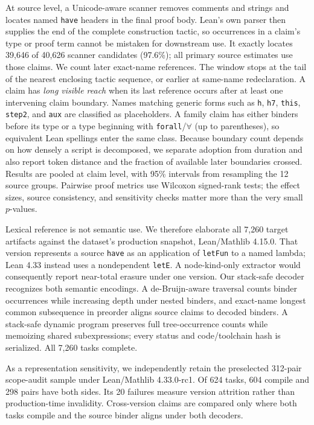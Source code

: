 \documentclass[10pt]{article}
\newcommand{\code}[1]{\texttt{#1}}
\begin{document}
At source level, a Unicode-aware scanner removes comments and strings and locates named
\code{have} headers in the final proof body.  Lean's own parser then supplies the end of the
complete construction tactic, so occurrences in a claim's type or proof term cannot be mistaken
for downstream use.  It exactly locates 39,646 of 40,626 scanner candidates (97.6\%); all primary
source estimates use those claims.  We count later exact-name references.  The window stops
at the tail of the nearest enclosing tactic sequence, or earlier at same-name redeclaration.  A claim has \emph{long visible
reach} when its last reference occurs after at least one intervening claim boundary.  Names matching
generic forms such as \code{h}, \code{h7}, \code{this}, \code{step2}, and \code{aux} are classified
as placeholders.  A family claim has either binders before its type or a type beginning with
\code{forall}/$\forall$ (up to parentheses), so equivalent Lean spellings enter the same class.
Because boundary count depends on how densely a script is decomposed, we separate adoption from
duration and also report token distance and the fraction of available later boundaries crossed.
Results are pooled at claim level, with 95\% intervals from resampling the 12
source groups.  Pairwise proof metrics use Wilcoxon signed-rank tests; the effect sizes, source
consistency, and sensitivity checks matter more than the very small $p$-values.

Lexical reference is not semantic use.  We therefore elaborate all 7,260 target artifacts against
the dataset's production snapshot, Lean/Mathlib 4.15.0.  That version represents a source
\code{have} as an application of \code{letFun} to a named lambda; Lean 4.33 instead uses a
nondependent \code{letE}.  A node-kind-only extractor would consequently report near-total erasure
under one version.  Our stack-safe decoder recognizes both semantic encodings.  A de-Bruijn-aware
traversal counts binder occurrences while increasing depth under nested binders, and exact-name
longest common subsequence in preorder aligns source claims to decoded binders.  A stack-safe
dynamic program preserves full tree-occurrence counts while memoizing shared subexpressions; every
status and code/toolchain hash is serialized.  All 7,260 tasks complete.

As a representation sensitivity, we independently retain the preselected 312-pair scope-audit
sample under Lean/Mathlib 4.33.0-rc1.  Of 624 tasks, 604 compile and 298 pairs have both sides.  Its
20 failures measure version attrition rather than production-time invalidity.  Cross-version claims
are compared only where both tasks compile and the source binder aligns under both decoders.
\end{document}
